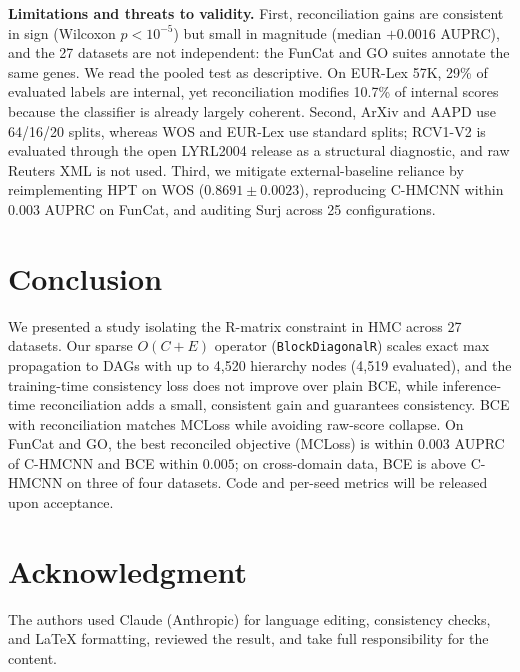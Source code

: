 \documentclass[conference]{IEEEtran}
\begin{document}
\textbf{Limitations and threats to validity.} First, reconciliation gains are
consistent in sign (Wilcoxon $p < 10^{-5}$) but small in magnitude (median
$+0.0016$ AUPRC), and the 27 datasets are not independent: the FunCat and GO
suites annotate the same genes. We read the pooled test as descriptive. On EUR-Lex 57K, 29\% of
evaluated labels are internal, yet reconciliation modifies 10.7\% of internal
scores because the classifier is already largely coherent. Second, ArXiv and
AAPD use 64/16/20 splits, whereas WOS and EUR-Lex use standard splits; RCV1-V2
is evaluated through the open LYRL2004 release as a structural diagnostic, and
raw Reuters XML is not used. Third, we mitigate external-baseline reliance by
reimplementing HPT on WOS ($0.8691 \pm 0.0023$), reproducing C-HMCNN within
$0.003$ AUPRC on FunCat, and auditing Surj across 25 configurations.

\section{Conclusion}
\label{sec:conclusion}

We presented a study isolating the R-matrix constraint in HMC across 27
datasets. Our sparse $O(C{+}E)$ operator (\texttt{BlockDiagonalR}) scales exact
max propagation to DAGs with up to 4{,}520 hierarchy nodes (4{,}519 evaluated),
and the training-time consistency loss does not improve over plain BCE, while
inference-time reconciliation adds a small, consistent gain and guarantees
consistency. BCE with reconciliation matches MCLoss while avoiding raw-score
collapse. On FunCat and GO, the best reconciled objective (MCLoss) is within
$0.003$ AUPRC of C-HMCNN and BCE within $0.005$; on cross-domain data, BCE is
above C-HMCNN on three of four datasets. Code and per-seed metrics will be
released upon acceptance.

\section*{Acknowledgment}
The authors used Claude (Anthropic) for language editing, consistency checks,
and \LaTeX{} formatting, reviewed the result, and take full responsibility for
the content.



\end{document}
